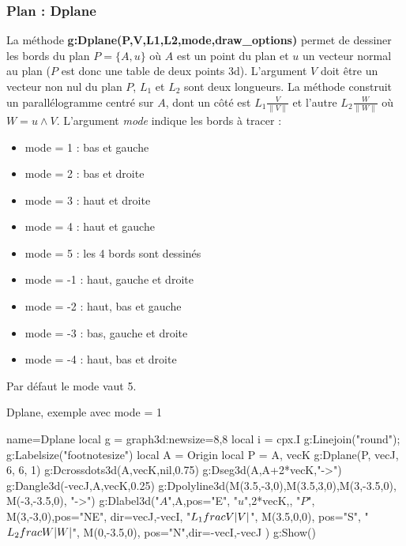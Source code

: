 \subsubsection{Plan : Dplane}

La méthode \textbf{g:Dplane(P,V,L1,L2,mode,draw\_options)} permet de dessiner les bords du plan $P=\{A,u\}$ où $A$ est un point du plan et $u$ un vecteur normal au plan ($P$ est donc une table de deux points 3d). L'argument $V$ doit être un vecteur non nul du plan $P$, $L_1$ et $L_2$ sont deux longueurs. La méthode construit un parallélogramme centré sur $A$, dont un côté est $L_1\frac{V}{\|V\|}$ et l'autre $L_2\frac{W}{\|W\|}$ où $W = u\wedge V$. L'argument \emph{mode} indique les bords à tracer :
    \begin{itemize}
        \item mode = 1 : bas et gauche
        \item mode = 2 : bas et droite
        \item mode = 3 : haut et droite
        \item mode = 4 : haut et gauche
        \item mode = 5 : les 4 bords sont dessinés
        \item mode = -1 : haut, gauche et droite
        \item mode = -2 : haut, bas et gauche
        \item mode = -3 : bas, gauche et droite
        \item mode = -4 : haut, bas et droite
    \end{itemize}
    Par défaut le mode vaut 5.

\begin{demo}{Dplane, exemple avec mode = 1}
\begin{luadraw}{name=Dplane}
local g = graph3d:new{size={8,8}}
local i = cpx.I
g:Linejoin("round"); g:Labelsize("footnotesize")
local A = Origin
local P = {A, vecK}
g:Dplane(P, vecJ, 6, 6, 1)
g:Dcrossdots3d({A,vecK},nil,0.75)
g:Dseg3d({A,A+2*vecK},"->")
g:Dangle3d(-vecJ,A,vecK,0.25)
g:Dpolyline3d({{M(3.5,-3,0),M(3.5,3,0)},{M(3,-3.5,0), M(-3,-3.5,0)}}, "->")
g:Dlabel3d("$A$",A,{pos="E"}, 
    "$u$",2*vecK,{},
    "$P$", M(3,-3,0),{pos="NE", dir={vecJ,-vecI}},
    "$L_1\\frac{V}{\\|V\\|}$", M(3.5,0,0), {pos="S"},
    "$L_2\\frac{W}{\\|W\\|}$", M(0,-3.5,0), {pos="N",dir={-vecI,-vecJ}}
)
g:Show()
\end{luadraw}
\end{demo}

